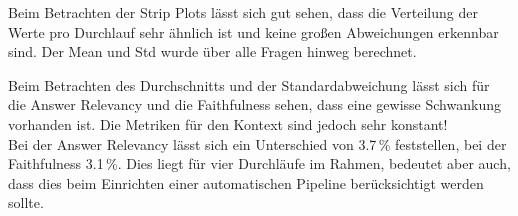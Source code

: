Beim Betrachten der Strip Plots lässt sich gut sehen, dass die Verteilung der Werte pro Durchlauf sehr ähnlich ist und keine großen Abweichungen erkennbar sind.
Der Mean und Std wurde über alle Fragen hinweg berechnet.

\begin{table}[h!]
    \centering
    \caption{Durchschnittswerte und Standardabweichungen der Metriken über vier Durchläufe für DeepSeek}
\end{table}

Beim Betrachten des Durchschnitts und der Standardabweichung lässt sich für die Answer Relevancy und die Faithfulness sehen, dass eine gewisse Schwankung vorhanden ist. Die Metriken für den Kontext sind jedoch sehr konstant!\\
Bei der Answer Relevancy lässt sich ein Unterschied von 3.7\,\% feststellen, bei der Faithfulness 3.1\,\%. Dies liegt für vier Durchläufe im Rahmen, bedeutet aber auch, dass dies beim Einrichten einer automatischen Pipeline berücksichtigt werden sollte.

\begin{table}[h!]
    \centering
    \caption{Durchschnittswerte und Standardabweichungen der Metriken über vier Durchläufe für GPT-4}
\end{table}

